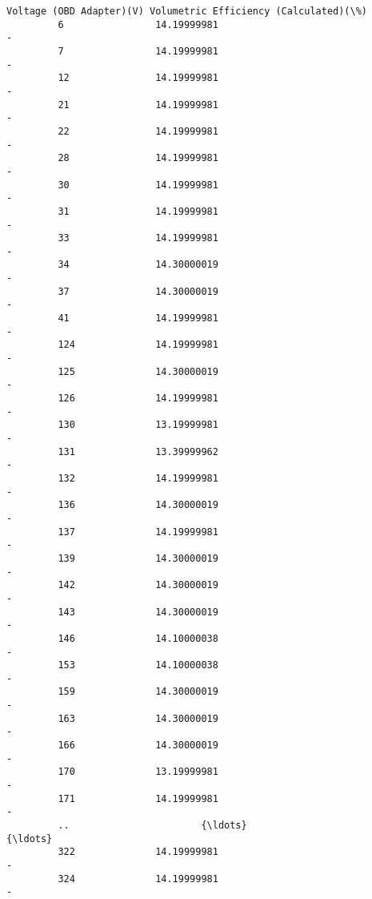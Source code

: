 \documentclass[11pt]{article}
\begin{document}
\begin{Verbatim}[commandchars=\\\{\}]
             Voltage (OBD Adapter)(V) Volumetric Efficiency (Calculated)(\%)  
         6                14.19999981                                     -  
         7                14.19999981                                     -  
         12               14.19999981                                     -  
         21               14.19999981                                     -  
         22               14.19999981                                     -  
         28               14.19999981                                     -  
         30               14.19999981                                     -  
         31               14.19999981                                     -  
         33               14.19999981                                     -  
         34               14.30000019                                     -  
         37               14.30000019                                     -  
         41               14.19999981                                     -  
         124              14.19999981                                     -  
         125              14.30000019                                     -  
         126              14.19999981                                     -  
         130              13.19999981                                     -  
         131              13.39999962                                     -  
         132              14.19999981                                     -  
         136              14.30000019                                     -  
         137              14.19999981                                     -  
         139              14.30000019                                     -  
         142              14.30000019                                     -  
         143              14.30000019                                     -  
         146              14.10000038                                     -  
         153              14.10000038                                     -  
         159              14.30000019                                     -  
         163              14.30000019                                     -  
         166              14.30000019                                     -  
         170              13.19999981                                     -  
         171              14.19999981                                     -  
         ..                       {\ldots}                                   {\ldots}  
         322              14.19999981                                     -  
         324              14.19999981                                     -  

\end{Verbatim}
\end{document}
